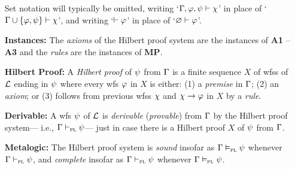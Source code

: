 \documentclass[a4paper, 11pt]{article} %
\begin{document}
\begin{enumerate}[leftmargin=1.2in]
\begin{itemize}[leftmargin=.5in]
	      \end{itemize}
	      Set notation will typically be omitted, writing `$\Gamma, \varphi, \psi \vdash \chi$' in place of `$\Gamma\cup\lbrace\varphi,\psi\rbrace \vdash \chi$', and writing `$\vdash \varphi$' in place of `$\varnothing \vdash\varphi$'.
	\item[\bf Instances:] The \textit{axioms} of the Hilbert proof system are the instances of \textbf{A1} -- \textbf{A3} and the \textit{rules} are the instances of \textbf{MP}.
	\item[\bf Hilbert Proof:] A \textit{Hilbert proof} of $\psi$ from $\Gamma$ is a finite sequence $X$ of wfss of $\mathcal{L}$ ending in $\psi$ where every wfs $\varphi$ in $X$ is either: (1) a \textit{premise} in $\Gamma$; (2) an \textit{axiom}; or (3) follows from previous wfss $\chi$ and $\chi \rightarrow \varphi$ in $X$ by a \textit{rule}.
	\item[\bf Derivable:] A wfs $\psi$ of $\mathcal{L}$ is \textit{derivable} (\textit{provable}) from $\Gamma$ by the Hilbert proof system--- i.e., $\Gamma \vdash_{\textsc{pl}} \psi$--- just in case there is a Hilbert proof $X$ of $\psi$ from $\Gamma$.
  \item[\bf Metalogic:] The Hilbert proof system is \textit{sound} insofar as $\Gamma \vDash_{\textsc{pl}} \psi$ whenever $\Gamma \vdash_{\textsc{pl}} \psi$, and \textit{complete} insofar as $\Gamma \vdash_{\textsc{pl}} \psi$ whenever $\Gamma \vDash_{\textsc{pl}} \psi$.
\end{enumerate}
\end{document}
